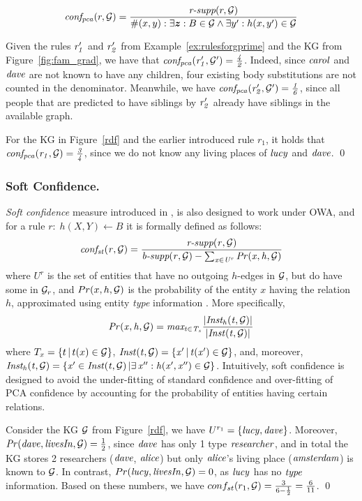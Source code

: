 \[
\mi{conf_{pca}}(r, \cG) = \frac{\textit{r-supp}(r, \cG)}{\#(x,y): \exists \vec{z}: B \in \cG  \wedge \exists y': h(x,y')\in \cG}
\]
\begin{example}
Given the rules $\mathit{r_1'}$ and $\mathit{r_2'}$ from Example~\ref{ex:rulesforgprime} and the KG from Figure~\ref{fig:fam_grad}, we have that $\mathit{conf_{pca}(r_1',\mathcal{G}') = \frac{4}{2}}$. Indeed, since $\mathit{carol}$ and $\mathit{dave}$ are not known
to have any children, four existing body substitutions are not counted in the
denominator. Meanwhile, we have $\mathit{conf_{pca}(r_2', \mathcal{G}') = \frac{1}{6}}$, since all people that are predicted to have siblings by $\mathit{r_2'}$ already have siblings in the available graph.

For the KG in Figure~\ref{rdf} and the earlier introduced rule $r_1$, it holds that $\mathit{conf_{pca}(r_1,\mathcal{G}) = \frac{3}{4}}$, since we do not know any living places of $\mathit{lucy}$ and $\mathit{dave}$. %
\qed
\end{example}

\subsubsection{Soft Confidence.} \emph{Soft confidence} measure introduced in \cite{rdf2rules}, is also designed to work under OWA, and for a rule $r:\;h(X,Y)\leftarrow B$ it is formally defined as follows:
\[\mathit{conf_{st}(r, \mathcal{G}) = \frac{\textit{r-supp}(r, \mathcal{G})}{\textit{b-supp}(r,\mathcal{G}) - \sum_{x \in U^r}Pr(x,h,\mathcal{G})}} \]
where $U^r$ is the set of entities %
that have no outgoing %
$h$-edges in $\mathcal{G}$, but do have some in $\mathcal{G}_r$, and $Pr(x,h,\mathcal{G})$ is the probability of the entity $x$ having the relation $h$, approximated using entity \textit{type} information \cite{rdf2rules}. More specifically,
\[\mathit{Pr(x,h,\mathcal{G})  = max_{t \in T_{x}}\frac{|Inst_h(t, \mathcal{G})|}{|Inst(t, \mathcal{G})|}{}}\]
where $T_{x}=\{t\,|\,t(x)\in \mathcal{G}\}$, $\mathit{Inst(t, \mathcal{G})=\{x'\,|\,t(x')\in \mathcal{G}\}}$, and, moreover, \\$\mathit{Inst_h(t, \mathcal{G})=\{x'\in Inst(t,\mathcal{G})\,|\exists \,x'':h(x',x'')\in\mathcal{G}\}}$.
Intuitively, soft confidence is designed to avoid the under-fitting of standard confidence and over-fitting of PCA confidence by accounting for the probability of entities having certain relations.
\begin{example}
Consider the KG $\mathcal{G}$ from Figure~\ref{rdf}, we have $U^{r_1} = \{\mathit{lucy, dave}\}$. %
Moreover, $\mathit{Pr(dave,livesIn,\mathcal{G})} = \frac{1}{2}$, since $\mathit{dave}$ has only 1 type $\mathit{researcher}$, and in total the KG stores 
2 researchers ($\mathit{dave}$, $\mathit{alice}$) but only $\mathit{alice}$'s living place ($\mathit{amsterdam}$) is known to $\mathcal{G}$. In contrast, $Pr(\mathit{lucy,livesIn,\mathcal{G}}) = 0$, as $\mathit{lucy}$ has no $\mathit{type}$ information.
Based on these numbers, we have $conf_{st}(r_1,\mathcal{G}) = \frac{3}{6-\frac{1}{2}} = \frac{6}{11}$. \qed %
\end{example}

